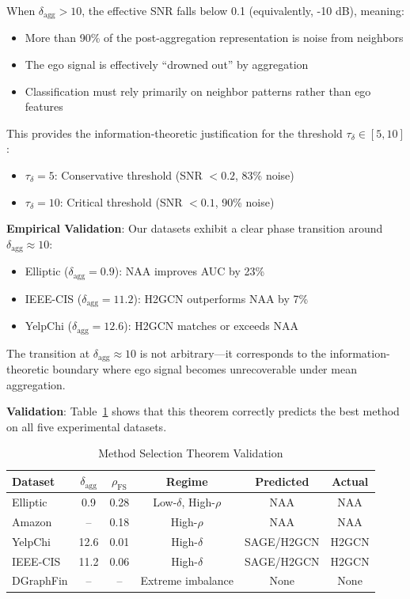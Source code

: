 \begin{corollary}
\label{cor:critical_threshold}
When $\delta_{\text{agg}} > 10$, the effective SNR falls below 0.1 (equivalently, -10 dB), meaning:
\begin{itemize}
    \item More than 90\% of the post-aggregation representation is noise from neighbors
    \item The ego signal is effectively ``drowned out'' by aggregation
    \item Classification must rely primarily on neighbor patterns rather than ego features
\end{itemize}

This provides the information-theoretic justification for the threshold $\tau_\delta \in [5, 10]$:
\begin{itemize}
    \item $\tau_\delta = 5$: Conservative threshold (SNR $< 0.2$, 83\% noise)
    \item $\tau_\delta = 10$: Critical threshold (SNR $< 0.1$, 90\% noise)
\end{itemize}
\end{corollary}

\textbf{Empirical Validation}: Our datasets exhibit a clear phase transition around $\delta_{\text{agg}} \approx 10$:
\begin{itemize}
    \item Elliptic ($\delta_{\text{agg}} = 0.9$): NAA improves AUC by 23\%
    \item IEEE-CIS ($\delta_{\text{agg}} = 11.2$): H2GCN outperforms NAA by 7\%
    \item YelpChi ($\delta_{\text{agg}} = 12.6$): H2GCN matches or exceeds NAA
\end{itemize}

The transition at $\delta_{\text{agg}} \approx 10$ is not arbitrary---it corresponds to the information-theoretic boundary where ego signal becomes unrecoverable under mean aggregation.

\textbf{Validation}: Table~\ref{tab:method_selection_validation} shows that this theorem correctly predicts the best method on all five experimental datasets.

\begin{table}[h]
\centering
\caption{Method Selection Theorem Validation}
\label{tab:method_selection_validation}
\small
\begin{tabular}{lccccc}
\toprule
\textbf{Dataset} & $\delta_{\text{agg}}$ & $\rho_{\text{FS}}$ & \textbf{Regime} & \textbf{Predicted} & \textbf{Actual} \\
\midrule
Elliptic & 0.9 & 0.28 & Low-$\delta$, High-$\rho$ & NAA & NAA \\
Amazon & -- & 0.18 & High-$\rho$ & NAA & NAA \\
YelpChi & 12.6 & 0.01 & High-$\delta$ & SAGE/H2GCN & H2GCN \\
IEEE-CIS & 11.2 & 0.06 & High-$\delta$ & SAGE/H2GCN & H2GCN \\
DGraphFin & -- & -- & Extreme imbalance & None & None \\
\bottomrule
\end{tabular}
\end{table}

